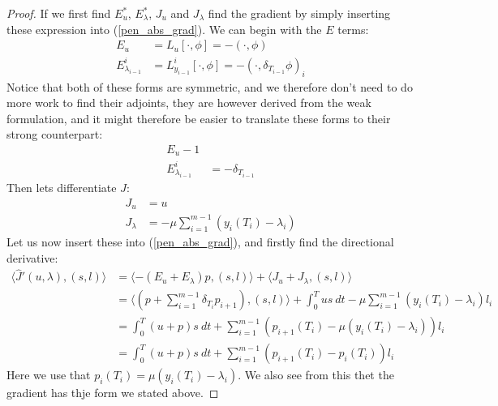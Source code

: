 \documentclass[11pt,a4paper]{article}
\begin{document}
\begin{proof}
If we first find $E_u^*$, $E_{\lambda}^*$, $J_u$ and $J_{\lambda}$ find the gradient by simply inserting these expression into (\ref{pen_abs_grad}). We can begin with the $E$ terms:
\begin{align*}
E_u &= L_u[\cdot,\phi] = -(\cdot,\phi) \\
E_{\lambda_{i-1}}^i &= L_{y_{i-1}}^i[\cdot,\phi] = -(\cdot,\delta_{T_{i-1}}\phi)_i
\end{align*}
Notice that both of these forms are symmetric, and we therefore don't need to do more work to find their adjoints, they are however derived from the weak formulation, and it might therefore be easier to translate these forms to their strong counterpart:
\begin{align*}
E_u -1 \\
E_{\lambda_{i-1}}^i &= -\delta_{T_{i-1}}
\end{align*}
Then lets differentiate $J$:
\begin{align*}
J_u &= u \\
J_{\lambda} &= - \mu \sum_{i=1}^{m-1}(y_{i}(T_i)-\lambda_i)
\end{align*}
Let us now insert these into (\ref{pen_abs_grad}), and firstly find the directional derivative:
\begin{align*}
\langle \hat{J}'(u,\lambda), (s,l)\rangle&=\langle -(E_u+E_{\lambda})p, (s,l)\rangle + \langle J_u+J_{\lambda}, (s,l)\rangle \\
&= \langle (p+\sum_{i=1}^{m-1} \delta_{T_i}p_{i+1}) , (s,l)\rangle+ \int_0^T us \ dt - \mu \sum_{i=1}^{m-1}(y_{i}(T_i)-\lambda_i)l_i\\
&=\int_0^T (u+p)s \ dt +\sum_{i=1}^{m-1}(p_{i+1}(T_i) -\mu(y_{i}(T_i)-\lambda_i) )l_i \\
&= \int_0^T (u+p)s \ dt +\sum_{i=1}^{m-1}(p_{i+1}(T_i) -p_{i}(T_i) )l_i
\end{align*} 
Here we use that $p_i(T_i) = \mu(y_{i}(T_i)-\lambda_i)$. We also see from this thet the gradient has thje form we stated above.
\end{proof} 
\end{document}
